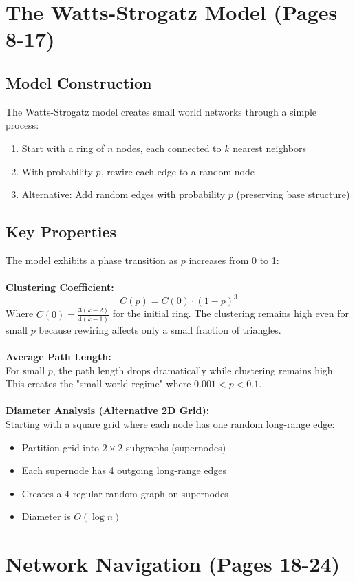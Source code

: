 \documentclass[11pt,a4paper]{article}
\theoremstyle{definition}
\begin{document}
\section{The Watts-Strogatz Model (Pages 8-17)}
\subsection{Model Construction}
The Watts-Strogatz model creates small world networks through a simple process:
\begin{enumerate}
\item Start with a ring of $n$ nodes, each connected to $k$ nearest neighbors
\item With probability $p$, rewire each edge to a random node
\item Alternative: Add random edges with probability $p$ (preserving base structure)
\end{enumerate}
\subsection{Key Properties}
The model exhibits a phase transition as $p$ increases from 0 to 1:\\
\\
\textbf{Clustering Coefficient:}\\
$$
C(p) = C(0)\cdot (1-p)^3
$$
Where $C(0) = \frac{3(k-2)}{4(k-1)}$ for the initial ring. The clustering remains high even for small $p$ because rewiring affects only a small fraction of triangles.\\
\\
\textbf{Average Path Length:}\\
For small $p$, the path length drops dramatically while clustering remains high. This creates the "small world regime" where $0.001 < p < 0.1$.\\
\\
\textbf{Diameter Analysis (Alternative 2D Grid):}\\
Starting with a square grid where each node has one random long-range edge:
\begin{itemize}
\item Partition grid into $2 \times 2$ subgraphs (supernodes)
\item Each supernode has 4 outgoing long-range edges
\item Creates a 4-regular random graph on supernodes
\item Diameter is $O(\log n)$
\end{itemize}
\section{Network Navigation (Pages 18-24)}
\end{document}

